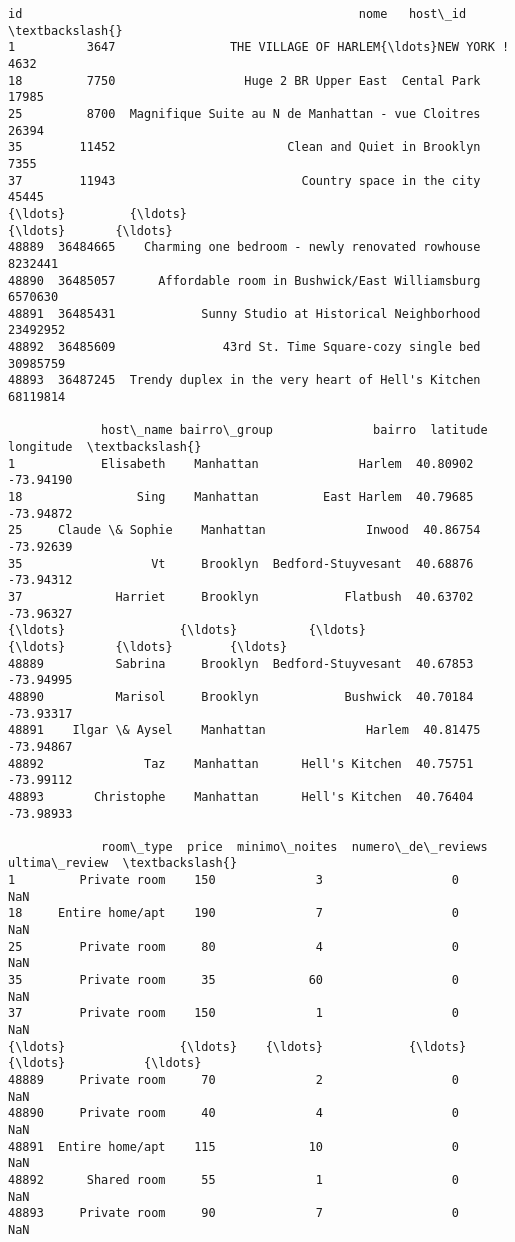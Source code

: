 \documentclass[11pt]{article}
\begin{document}
    \begin{Verbatim}[commandchars=\\\{\}]
             id                                               nome   host\_id  \textbackslash{}
1          3647                THE VILLAGE OF HARLEM{\ldots}NEW YORK !      4632
18         7750                  Huge 2 BR Upper East  Cental Park     17985
25         8700  Magnifique Suite au N de Manhattan - vue Cloitres     26394
35        11452                        Clean and Quiet in Brooklyn      7355
37        11943                          Country space in the city     45445
{\ldots}         {\ldots}                                                {\ldots}       {\ldots}
48889  36484665    Charming one bedroom - newly renovated rowhouse   8232441
48890  36485057      Affordable room in Bushwick/East Williamsburg   6570630
48891  36485431            Sunny Studio at Historical Neighborhood  23492952
48892  36485609               43rd St. Time Square-cozy single bed  30985759
48893  36487245  Trendy duplex in the very heart of Hell's Kitchen  68119814

             host\_name bairro\_group              bairro  latitude  longitude  \textbackslash{}
1            Elisabeth    Manhattan              Harlem  40.80902  -73.94190
18                Sing    Manhattan         East Harlem  40.79685  -73.94872
25     Claude \& Sophie    Manhattan              Inwood  40.86754  -73.92639
35                  Vt     Brooklyn  Bedford-Stuyvesant  40.68876  -73.94312
37             Harriet     Brooklyn            Flatbush  40.63702  -73.96327
{\ldots}                {\ldots}          {\ldots}                 {\ldots}       {\ldots}        {\ldots}
48889          Sabrina     Brooklyn  Bedford-Stuyvesant  40.67853  -73.94995
48890          Marisol     Brooklyn            Bushwick  40.70184  -73.93317
48891    Ilgar \& Aysel    Manhattan              Harlem  40.81475  -73.94867
48892              Taz    Manhattan      Hell's Kitchen  40.75751  -73.99112
48893       Christophe    Manhattan      Hell's Kitchen  40.76404  -73.98933

             room\_type  price  minimo\_noites  numero\_de\_reviews ultima\_review  \textbackslash{}
1         Private room    150              3                  0           NaN
18     Entire home/apt    190              7                  0           NaN
25        Private room     80              4                  0           NaN
35        Private room     35             60                  0           NaN
37        Private room    150              1                  0           NaN
{\ldots}                {\ldots}    {\ldots}            {\ldots}                {\ldots}           {\ldots}
48889     Private room     70              2                  0           NaN
48890     Private room     40              4                  0           NaN
48891  Entire home/apt    115             10                  0           NaN
48892      Shared room     55              1                  0           NaN
48893     Private room     90              7                  0           NaN


\end{Verbatim}
\end{document}
